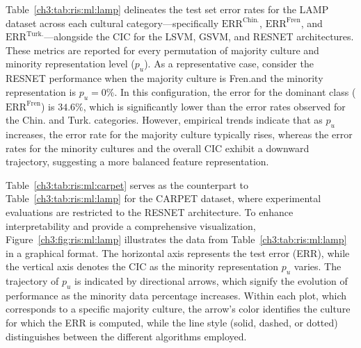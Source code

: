 Table~\ref{ch3:tab:ris:ml:lamp} delineates the test set error rates for the LAMP dataset across each cultural category—specifically $\text{ERR}^{\text{Chin.}}$, $\text{ERR}^{\text{Fren}}$, and $\text{ERR}^{\text{Turk.}}$—alongside the CIC for the LSVM, GSVM, and RESNET architectures. 
These metrics are reported for every permutation of majority culture and minority representation level ($p_u$).
As a representative case, consider the RESNET performance when the majority culture is Fren.and the minority representation is $p_u=0\%$. In this configuration, the error for the dominant class ($\text{ERR}^{\text{Fren}}$) is $34.6\%$, which is significantly lower than the error rates observed for the Chin. and Turk. categories. 
However, empirical trends indicate that as $p_u$ increases, the error rate for the majority culture typically rises, whereas the error rates for the minority cultures and the overall CIC exhibit a downward trajectory, suggesting a more balanced feature representation.

Table~\ref{ch3:tab:ris:ml:carpet} serves as the counterpart to Table~\ref{ch3:tab:ris:ml:lamp} for the CARPET dataset, where experimental evaluations are restricted to the RESNET architecture.
To enhance interpretability and provide a comprehensive visualization, Figure~\ref{ch3:fig:ris:ml:lamp} illustrates the data from Table~\ref{ch3:tab:ris:ml:lamp} in a graphical format. 
The horizontal axis represents the test error (ERR), while the vertical axis denotes the CIC as the minority representation $p_u$ varies. 
The trajectory of $p_u$ is indicated by directional arrows, which signify the evolution of performance as the minority data percentage increases. 
Within each plot, which corresponds to a specific majority culture, the arrow's color identifies the culture for which the ERR is computed, while the line style (solid, dashed, or dotted) distinguishes between the different algorithms employed.

